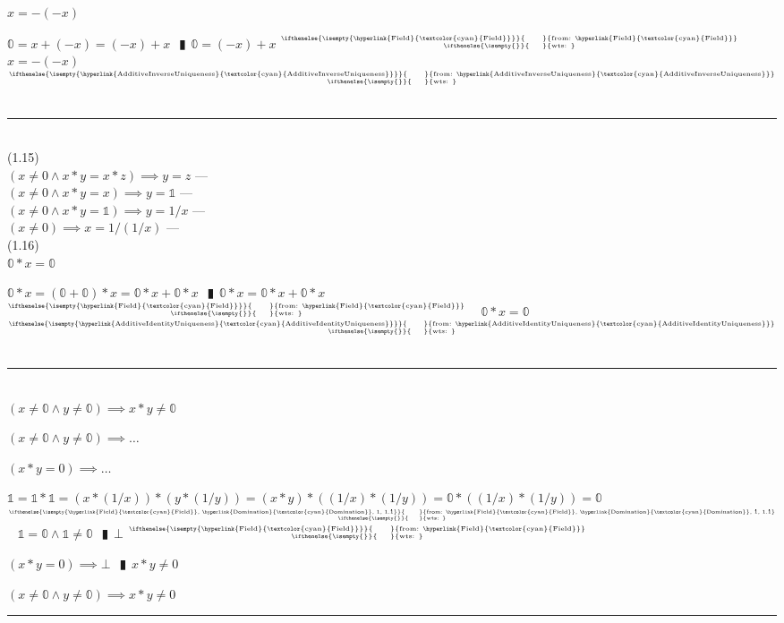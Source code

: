 \documentclass{book}
\newcommand{\wff}[1]{\hypertarget{#1}{\fbox{\textcolor{red}{#1}}\phantom{--}}}
\newcommand{\rf}[1]{\hyperlink{#1}{\textcolor{cyan}{#1}}}
\newcommand{\pipe}{$\phantom{(}\vrectangleblack\phantom{)}$}
\newcommand{\pr}[1]{\left(#1\right)}
\newcommand{\ann}[2]{%
  \hfill %
  $\stackrel%
  {\hbox{\tiny{\ifthenelse{\isempty{#1}}%
    {\phantom{from}}%
    {from: #1}}}}%
  {\hbox{\tiny{\ifthenelse{\isempty{#2}}%
    {\phantom{wts}}%
    {wts: #2}}}}$%
\ }
\begin{document}
\wff{DoubleNegative} $x = -(-x)$
\begin{enumerate}
  \lit $\mathbb{0} = x + (-x) = (-x) + x$ \pipe $\mathbb{0} = (-x) + x$    \ann{\rf{Field}}{}
  \lit $x = -(-x)$    \ann{\rf{AdditiveInverseUniqueness}}{}
\end{enumerate} \vspace{.75mm} \hrule \vspace{.75mm} \ \\

(1.15) \\
\wff{MultiplicativeCancellation} $(x \neq 0 \land x * y = x * z) \implies y = z$    \phantom{TODO}--- \\

\wff{MultiplicativeIdentityUniqueness} $(x \neq 0 \land x * y = x) \implies y = \mathbb{1}$    \phantom{TODO}--- \\

\wff{MultiplicativeInverseUniqueness} $(x \neq 0 \land x * y = \mathbb{1}) \implies y = 1/x$    \phantom{TODO}--- \\

\wff{DoubleReciprocal} $(x \neq 0) \implies x = 1/(1/x)$    \phantom{TODO}--- \\

(1.16) \\
\wff{Domination} $\mathbb{0} * x = \mathbb{0}$
\begin{enumerate}
  \lit $\mathbb{0} * x = (\mathbb{0} + \mathbb{0}) * x = \mathbb{0} * x + \mathbb{0} * x$ \pipe $\mathbb{0} * x =  \mathbb{0} * x + \mathbb{0} * x$    \ann{\rf{Field}}{}
  \lit $\mathbb{0} * x = \mathbb{0}$    \ann{\rf{AdditiveIdentityUniqueness}}{}
\end{enumerate} \vspace{.75mm} \hrule \vspace{.75mm} \ \\

\wff{NonDomination} $(x \neq \mathbb{0} \land y \neq \mathbb{0}) \implies x * y \neq \mathbb{0}$
\begin{enumerate}
  \lit $(x \neq \mathbb{0} \land y \neq \mathbb{0}) \implies \ldots$
  \begin{enumerate}
    \lit $(x * y = 0) \implies \ldots$
    \begin{enumerate}
      \lit $\mathbb{1} = \mathbb{1} * \mathbb{1} = \pr{x * (1/x)} * \pr{y * (1/y)} = (x * y) * \pr{(1/x) * (1/y)} = \mathbb{0} * \pr{(1/x) * (1/y)} = \mathbb{0}$    \ann{\rf{Field}, \rf{Domination}, 1, 1.1}{}
      \lit $\mathbb{1} = \mathbb{0} \land \mathbb{1} \neq \mathbb{0}$ \pipe $\bot$    \ann{\rf{Field}}{}
    \end{enumerate}
  \lit $(x * y = 0) \implies \bot$ \pipe $x * y \neq 0$
  \end{enumerate}
  \lit $(x \neq \mathbb{0} \land y \neq \mathbb{0}) \implies x * y \neq 0$
\end{enumerate} \vspace{.75mm} \hrule \vspace{.75mm} \ \\
\end{document}
